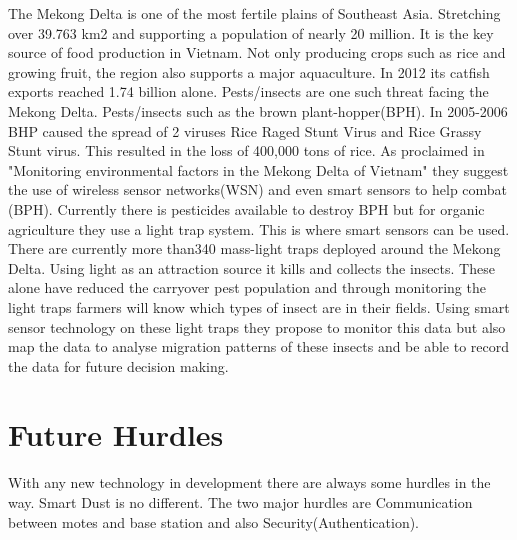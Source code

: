 \documentclass[article]{IEEEtran}
\begin{document}
The Mekong Delta is one of the most fertile plains of Southeast Asia. Stretching over 39.763 km2 and supporting a population of nearly 20 million. It is the key source of food production in Vietnam. Not only producing crops such as rice and growing fruit, the region also supports a major aquaculture. In 2012 its catfish exports reached 1.74 billion alone\cite{MekongDelta}.
Pests/insects are one such threat facing the Mekong Delta. Pests/insects such as the brown plant-hopper(BPH). In 2005-2006 BHP caused the spread of 2 viruses Rice Raged Stunt Virus and Rice Grassy Stunt virus. This resulted in the loss of 400,000 tons of rice. 
As proclaimed in "Monitoring environmental factors in the Mekong Delta of Vietnam"\cite{MekongDelta} they suggest the use of wireless sensor networks(WSN) and even smart sensors to help combat (BPH). Currently there is pesticides available to destroy BPH but for organic agriculture they use a light trap system. This is where smart sensors can be used.  There are currently more than340 mass-light traps deployed around the Mekong Delta. Using light as an attraction source it kills and collects the insects. These alone have reduced the carryover pest population and through monitoring the light traps farmers will know which types of insect are in their fields. Using smart sensor technology on these light traps they propose to monitor this data but also map the data to analyse migration patterns of these insects and be able to record the data for future decision making\cite{MekongDelta}.

\section{Future Hurdles}

With any new technology in development there are always some hurdles in the way. Smart Dust is no different. The two major hurdles are Communication between motes and base station and also Security(Authentication). 
\end{document}
